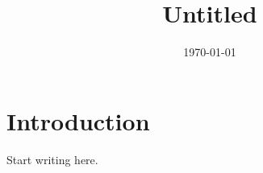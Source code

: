 \documentclass{article}
\title{Untitled}
\author{}
\date{\today}
\begin{document}
\maketitle

\section{Introduction}

Start writing here.
\end{document}
